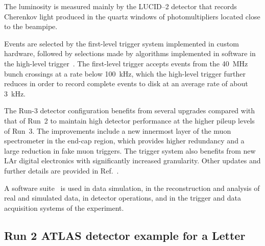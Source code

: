 The luminosity is measured mainly by the LUCID--2 detector that records Cherenkov light produced in the quartz windows of photomultipliers located close to the beampipe.

Events are selected by the first-level trigger system implemented in custom hardware,
followed by selections made by algorithms implemented in software in the high-level trigger~\cite{TRIG-2016-01}. 
The first-level trigger accepts events from the \qty{40}{\MHz} bunch crossings at a rate below \qty{100}{\kHz},
which the high-level trigger further reduces in order to record complete events to disk at an average rate of about \qty{3}{\kHz}.

The Run-3 detector configuration benefits from several upgrades compared with that of Run~2 to maintain high detector performance at the higher pileup levels of Run~3. The improvements include a new innermost layer of the muon spectrometer in the end-cap region, which provides higher redundancy and a large reduction in fake muon triggers. The trigger system also benefits from new LAr digital electronics with significantly increased granularity. Other updates and further details are provided in Ref.~\cite{GENR-2019-02}.

A software suite~\cite{ATL-SOFT-PUB-2021-001} is used in data simulation, in the reconstruction
and analysis of real and simulated data, in detector operations, and in the trigger and data acquisition
systems of the experiment.

\subsection{Run 2 ATLAS detector example for a Letter}
\label{sec:atlas2a}

